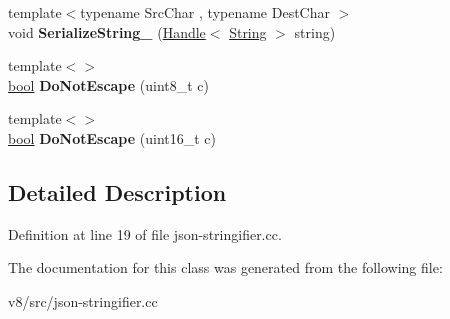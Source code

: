 \begin{DoxyCompactItemize}
{\footnotesize template$<$typename Src\+Char , typename Dest\+Char $>$ }\\void {\bfseries Serialize\+String\+\_\+} (\mbox{\hyperlink{classv8_1_1internal_1_1Handle}{Handle}}$<$ \mbox{\hyperlink{classv8_1_1internal_1_1String}{String}} $>$ string)
\item 
\mbox{\label{classv8_1_1internal_1_1JsonStringifier_a4e9e0fc3a523eaa93bc6b111e5e835d8}} 
{\footnotesize template$<$$>$ }\\\mbox{\hyperlink{classbool}{bool}} {\bfseries Do\+Not\+Escape} (uint8\+\_\+t c)
\item 
\mbox{\label{classv8_1_1internal_1_1JsonStringifier_a526ec593b4e708a72794eec0427a2851}} 
{\footnotesize template$<$$>$ }\\\mbox{\hyperlink{classbool}{bool}} {\bfseries Do\+Not\+Escape} (uint16\+\_\+t c)
\end{DoxyCompactItemize}


\subsection{Detailed Description}


Definition at line 19 of file json-\/stringifier.\+cc.



The documentation for this class was generated from the following file\+:\begin{DoxyCompactItemize}
\item 
v8/src/json-\/stringifier.\+cc\end{DoxyCompactItemize}
